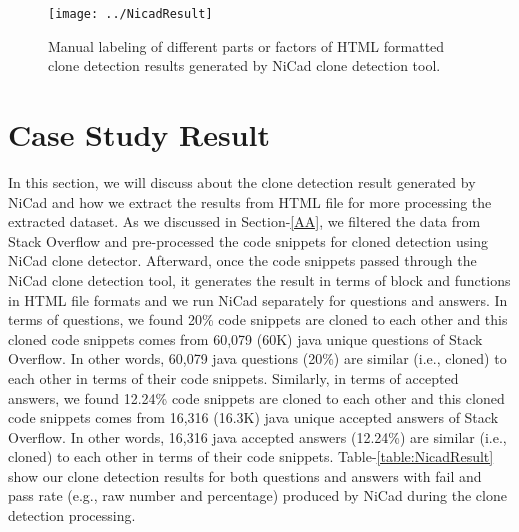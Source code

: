 \documentclass[conference]{IEEEtran}
\begin{document}
	\begin{figure*}[ht]
		\centering
		\texttt{[image: ../NicadResult]}
		\caption{Manual labeling of different parts or factors of HTML formatted clone detection results generated by NiCad clone detection tool. }
		\label{fig:nicadCloningresult}
	\end{figure*}
	
	\section{Case Study Result }\label{CDPR}
	 In this section, we will discuss about the clone detection result generated by NiCad and how we extract the results from HTML file for more processing the extracted dataset.  As we discussed in Section-\ref{AA}, we filtered the data from Stack Overflow and pre-processed the code snippets for cloned detection using NiCad clone detector. Afterward, once the code snippets passed through the NiCad clone detection tool, it generates the result in terms of block and functions in HTML file formats and we run NiCad separately for questions and answers. In terms of questions, we found 20\% code snippets are cloned to each other and this cloned code snippets comes from 60,079 (60K) java unique questions of Stack Overflow. In other words, 60,079 java questions (20\%)  are similar (i.e., cloned) to each other in terms of their code snippets. Similarly, in terms of accepted answers, we found 12.24\% code snippets are cloned to each other and this cloned code snippets comes from 16,316 (16.3K)  java unique accepted answers of Stack Overflow. In other words, 16,316  java accepted answers (12.24\%)  are similar (i.e., cloned) to each other in terms of their code snippets. Table-\ref{table:NicadResult} show our clone detection results for both questions and answers with fail and pass rate (e.g., raw number and percentage) produced by NiCad during the clone detection processing.
	
\end{document}
